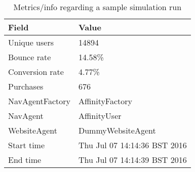 \begin{table}[h]
    \centering
    \caption{Metrics/info regarding a sample simulation run}
    \label{tab:genstats}
    \begin{tabular}{@{}ll@{}}
        \toprule
        \textbf{Field}  & \textbf{Value}               \\ \midrule
        Unique users    & 14894                        \\
        Bounce rate     & 14.58\%                      \\
        Conversion rate & 4.77\%                       \\
        Purchases       & 676                          \\
        NavAgentFactory & AffinityFactory              \\
        NavAgent        & AffinityUser                 \\
        WebsiteAgent    & DummyWebsiteAgent            \\
        Start time      & Thu Jul 07 14:14:36 BST 2016 \\
        End time        & Thu Jul 07 14:14:39 BST 2016 \\ \bottomrule
    \end{tabular}
\end{table}



